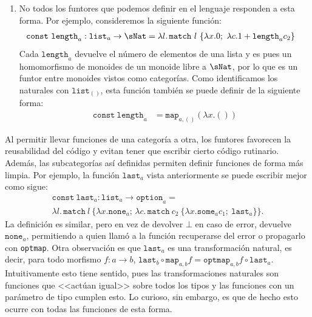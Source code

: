 \begin{example}
\begin{enumerate}
      \begin{align*}
        \mathtt{type\ id}_a & = a; & \mathtt{const\ idmap}_{a,b} & = \lambda f.\lambda x.(fx_*)^*
      \end{align*}
      Sin embargo, no podemos definir la composición de funtores dentro del
      lenguaje ya que los funtores no son valores, por lo que debemos razonar
      sobre ella desde fuera.
    \item No todos los funtores que podemos definir en el lenguaje responden a
      esta forma. Por ejemplo, consideremos la siguiente función:
      \begin{align*}
        \mathtt{const\ length}_a : \mathtt{list}_a \to \sNat
        & = \lambda l.\,\mathtt{match}\ l\ \{\lambda x. 0;\ \lambda c. 1+\mathtt{length}_ac_2\}
      \end{align*}
      Cada $\mathtt{length}_a$ devuelve el número de elementos de una lista y es
      pues un homomorfismo de monoides de un monoide libre a $\sNat$, por lo que
      es un funtor entre monoides vistos como categorías. Como identificamos los
      naturales con $\mathtt{list}_{()}$, esta función también se puede definir
      de la siguiente forma:
      \begin{align*}
        \mathtt{const\ length}_a & = \mathtt{map}_{a,()}(\lambda x.())
      \end{align*}
  \end{enumerate}
\end{example}

Al permitir llevar funciones de una categoría a otra, los funtores favorecen la
reusabilidad del código y evitan tener que escribir cierto código
rutinario. Además, las subcategorías así definidas permiten definir funciones de
forma más limpia. Por ejemplo, la función $\mathtt{last}_a$ vista anteriormente
se puede escribir mejor como sigue:
\begin{multline*}
  \mathtt{const\ last}_a:\mathtt{list}_a\to\mathtt{option}_a =\\
  \lambda l.\,\mathtt{match}\ l\ \{\lambda x.\mathtt{none}_a;\,\lambda c.\,\mathtt{match}\ c_2\ \{
  \lambda x.\mathtt{some}_ac_1;\ \mathtt{last}_a\}\}.
\end{multline*}
La definición es similar, pero en vez de devolver $\bot$ en caso de error,
devuelve $\mathtt{none}_a$, permitiendo a quien llamó a la función recuperarse
del error o propagarlo con \texttt{optmap}. Otra observación es que
$\mathtt{last}_a$ es una transformación natural, es decir, para todo morfismo
$f:a\to b$,
$\mathtt{last}_b\circ\mathtt{map}_{a,b}f=\mathtt{optmap}_{a,b}f\circ\mathtt{last}_a$.
Intuitivamente esto tiene sentido, pues las transformaciones naturales son
funciones que <<actúan igual>> sobre todos los tipos y las funciones con un
parámetro de tipo cumplen esto. Lo curioso, sin embargo, es que de hecho esto
ocurre con todas las funciones de esta forma.

